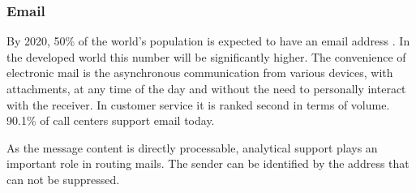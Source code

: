 		\subsubsection{Email}
		
		By 2020, 50\% of the world's population is expected to have an email address \citep{radicati2016}. In the developed world this number will be significantly higher. The convenience of electronic mail is the asynchronous communication from various devices, with attachments, at any time of the day and without the need to personally interact with the receiver. In customer service it is ranked second in terms of volume. 90.1\% of call centers support email \citep{dimensiondata2016} today. %
		
		As the message content is directly processable, analytical support plays an important role in routing mails. The sender can be identified by the address that can not be suppressed. 
